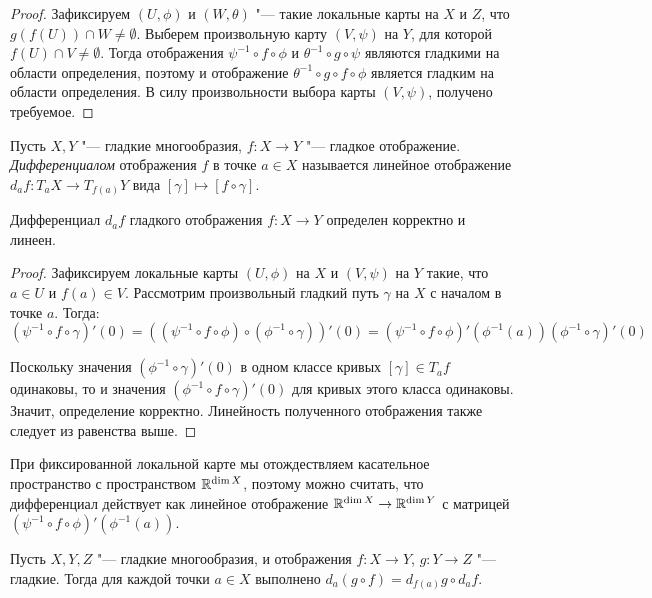 \begin{proof}
	Зафиксируем $(U, \phi)$ и $(W, \theta)$ "--- такие локальные карты на $X$ и $Z$, что $g(f(U)) \cap W \ne \emptyset$. Выберем произвольную карту $(V, \psi)$ на $Y$, для которой $f(U) \cap V \ne \emptyset$. Тогда отображения $\psi^{-1} \circ f \circ \phi$ и $\theta^{-1} \circ g \circ \psi$ являются гладкими на области определения, поэтому и отображение $\theta^{-1} \circ g \circ f \circ \phi$ является гладким на области определения. В силу произвольности выбора карты $(V, \psi)$, получено требуемое.
\end{proof}

\begin{definition}
	Пусть $X, Y$ "--- гладкие многообразия, $f : X \to Y$ "--- гладкое отображение. \textit{Дифференциалом} отображения $f$ в точке $a \in X$ называется линейное отображение $d_af: T_aX \to T_{f(a)}Y$ вида $[\gamma] \mapsto [f \circ \gamma]$.
\end{definition}

\begin{proposition}
	Дифференциал $d_af$ гладкого отображения $f: X \to Y$ определен корректно и линеен.
\end{proposition}

\begin{proof}
	Зафиксируем локальные карты $(U, \phi)$ на $X$ и $(V, \psi)$ на $Y$ такие, что $a \in U$ и $f(a) \in V$. Рассмотрим произвольный гладкий путь $\gamma$ на $X$ с началом в точке $a$. Тогда:
	\[(\psi^{-1} \circ f \circ \gamma)'(0) = \left((\psi^{-1} \circ f \circ \phi) \circ (\phi^{-1} \circ \gamma)\right)'(0) = (\psi^{-1} \circ f \circ \phi)'(\phi^{-1}(a))(\phi^{-1} \circ \gamma)'(0)\]
	
	Поскольку значения $(\phi^{-1} \circ \gamma)'(0)$ в одном классе кривых $[\gamma] \in T_af$ одинаковы, то и значения $(\phi^{-1} \circ f \circ \gamma)'(0)$ для кривых этого класса одинаковы. Значит, определение корректно. Линейность полученного отображения также следует из равенства выше.
\end{proof}

\begin{note}
	При фиксированной локальной карте мы отождествляем касательное пространство с пространством $\mathbb{R}^{\dim{X}}$, поэтому можно считать, что дифференциал действует как линейное отображение $\mathbb{R}^{\dim{X}} \to \mathbb{R}^{\dim{Y}}$ с матрицей $(\psi^{-1} \circ f \circ \phi)'(\phi^{-1}(a))$.
\end{note}

\begin{proposition}
	Пусть $X, Y, Z$ "--- гладкие многообразия, и отображения $f : X \to Y$, $g : Y \to Z$ "--- гладкие. Тогда для каждой точки $a \in X$ выполнено $d_a(g\circ f) = d_{f(a)}g \circ d_af$.
\end{proposition}

